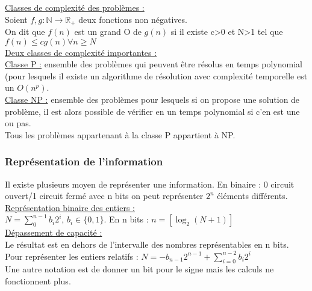 \documentclass[../main.tex]{subfiles}
\begin{document}
\quad \underline{Classes de complexité des problèmes :}\\
Soient $f, g : \mathbb{N} \rightarrow \mathbb{R}_+$ deux fonctions non négatives.\\
On dit que $f(n)$ est un grand O de $g(n)$ si il existe c>0 et N>1 tel que $f(n) \leq c g(n) \forall n\geq N$\\

\quad \underline{Deux classes de complexité importantes :}\\
\underline{Classe P :} ensemble des problèmes qui peuvent être résolus en temps polynomial (pour lesquels il existe un algorithme de résolution avec complexité temporelle est un $O(n^p)$.\\
\underline{Classe NP :} ensemble des problèmes pour lesquels si on propose une solution de problème, il est alors possible de vérifier en un temps polynomial si c'en est une ou pas.\\

Tous les problèmes appartenant à la classe P appartient à NP.\\

\subsubsection{Représentation de l'information}
Il existe plusieurs moyen de représenter une information. En binaire : 0 circuit ouvert/1 circuit fermé avec n bits on peut représenter $2^n$ éléments différents.\\

\quad \underline{Représentation binaire des entiers :}\\
$N = \sum_0^{n-1} b_i 2^i$, $b_i \in \{0,1\}$. En n bits : $n=[\log_2(N+1)]$\\

\quad \underline{Dépassement de capacité :}\\
Le résultat est en dehors de l'intervalle des nombres représentables en n bits.\\
Pour représenter les entiers relatifs : $N = -b_{n-1}2^{n-1} + \sum_{i=0}^{n-2} b_i 2^i$\\
Une autre notation est de donner un bit pour le signe mais les calculs ne fonctionnent plus. \\
\end{document}
